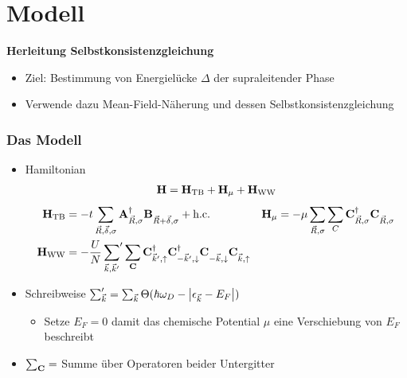 \section{ Modell }

\begin{frame}[plain]
    \centering
    \Large
    \textbf{Herleitung Selbstkonsistenzgleichung}
    \vspace{1cm}
    \begin{itemize}
        \item Ziel: Bestimmung von Energielücke $\Delta$ der supraleitender Phase
        \item Verwende dazu Mean-Field-Näherung und dessen Selbstkonsistenzgleichung
    \end{itemize}
\end{frame}


\begin{frame}
    \frametitle{Das Modell}
    \begin{itemize}
        \item Hamiltonian
        \begin{align*}
            \mathbf{H} = \mathbf{H}_{\text{TB}} + \mathbf{H}_{\mu} + \mathbf{H}_{\mathrm{WW}}
        \end{align*}
        \begin{align*}
            \oH_{\text{TB}} &= -t \sum_{\vec{R}, \vdelta, \sigma} \oad{\vec{R}, \sigma} \ob{\vec{R}+\vdelta, \sigma} + \hc &
            \oH_\mu &= - \mu \sum_{\vec{R}, \sigma} \sum_C \op{C}^{\dagg}_{\vec{R}, \sigma} \op{C}^{\pdagg}_{\vec{R}, \sigma} \\
            \oHWW &=  - \frac{U}{N} \sump{\vk, \vk'} \sum_\oC  \ocdu \ocdd \ocndd \ocndu 
        \end{align*}
        \item Schreibweise $\sum_{{\vec{k}}}' = \sum_{{\vec{k}}} \Theta(\hbar \omega_D - \abs{\epsilon_{\vec{k}} - E_F})$
        \begin{itemize}
            \item[$\rightarrow$] Setze $E_F = 0$ damit das chemische Potential $\mu$ eine Verschiebung von $E_F$ beschreibt
        \end{itemize}
        \item $\sum_\mathbf{C}  = $ Summe über Operatoren beider Untergitter
    \end{itemize}
\end{frame}

